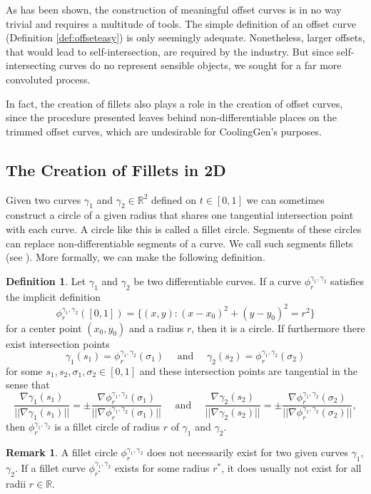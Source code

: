 \documentclass[a4paper, 11pt]{report}
\theoremstyle{definition}
\newtheorem{definition}{Definition}[section]
\newtheorem*{remark}{Remark}
\begin{document}
	As has been shown, the construction of meaningful offset curves is in no way trivial and requires a multitude of tools. The simple definition of an offset curve (Definition \ref{def:offseteasy}) is only seemingly adequate. Nonetheless, larger offsets, that would lead to self-intersection, are required by the industry. But since self-intersecting curves do no represent sensible objects, we sought for a far more convoluted process.

	In fact, the creation of fillets also plays a role in the creation of offset curves, since the procedure presented leaves behind non-differentiable places on the trimmed offset curves, which are undesirable for CoolingGen's purposes.

\subsection{The Creation of Fillets in 2D}\label{sec:filletcurves}
	Given two curves $\gamma_1$ and $\gamma_2 \in \mathbb{R}^2$ defined on $t \in [0,1]$ we can sometimes construct a circle of a given radius that shares one tangential intersection point with each curve. A circle like this is called a fillet circle. Segments of these circles can replace non-differentiable segments of a curve. We call such segments fillets (see \cite{Sorby2016}). More formally, we can make the following definition.

	\begin{definition}\label{def:filletcircle}
		Let $\gamma_1$ and $\gamma_2$ be two differentiable curves.
		If a curve $\phi^{\gamma_1, \gamma_2}_r$ satisfies the implicit definition
			$$\phi^{\gamma_1, \gamma_2}_r([0,1]) = \{(x,y) : (x-x_0)^2 + (y-y_0)^2 = r^2\}$$
		for a center point $(x_0, y_0)$ and a radius $r$, then it is a circle. If furthermore there exist intersection points
			$$ \gamma_1(s_1) = \phi^{\gamma_1, \gamma_2}_r(\sigma_1) \quad\text{ and }\quad \gamma_2(s_2) = \phi^{\gamma_1, \gamma_2}_r(\sigma_2) $$
		for some $s_1, s_2, \sigma_1, \sigma_2 \in [0,1]$ and these intersection points are tangential in the sense that
			$$
				\frac{\nabla \gamma_1(s_1)}{||\nabla \gamma_1(s_1)||} = 
				\pm\frac{\nabla \phi^{\gamma_1, \gamma_2}_r(\sigma_1)}{||\nabla \phi^{\gamma_1, \gamma_2}_r(\sigma_1)||} 
				\quad\text{ and }\quad 
				\frac{\nabla \gamma_2(s_2)}{||\nabla \gamma_2(s_2)||} =  
				\pm\frac{\nabla \phi^{\gamma_1, \gamma_2}_r(\sigma_2)}{||\nabla \phi^{\gamma_1, \gamma_2}_r(\sigma_2)||},
			$$
		then $\phi^{\gamma_1, \gamma_2}_r$ is a fillet circle of radius $r$ of $\gamma_1$ and $\gamma_2$.
	\end{definition}
	\begin{remark}
		A fillet circle $\phi^{\gamma_1, \gamma_2}_r$ does not necessarily exist for two given curves $\gamma_1$, $\gamma_2$. If a fillet 
		curve $\phi^{\gamma_1, \gamma_2}_{r^*}$ exists for some radius $r^*$, it does usually not exist for all radii $r \in \mathbb{R}$.
	\end{remark}
\end{document}
